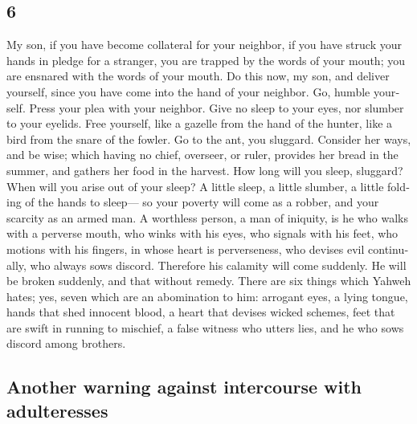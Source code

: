 \begin{paracol}{2}
\begin{otherlanguage}{english}
\hypertarget{section-11}{%
\section{6}\label{section-11}}

 My son, if you have become collateral for your neighbor,
if you have struck your hands in pledge for a stranger, 
you are trapped by the words of your mouth; you are ensnared with the
words of your mouth.  Do this now, my son, and deliver
yourself, since you have come into the hand of your neighbor. Go, humble
yourself. Press your plea with your neighbor.  Give no
sleep to your eyes, nor slumber to your eyelids.  Free
yourself, like a gazelle from the hand of the hunter, like a bird from
the snare of the fowler.  Go to the ant, you sluggard.
Consider her ways, and be wise;  which having no chief,
overseer, or ruler,  provides her bread in the summer, and
gathers her food in the harvest.  How long will you sleep,
sluggard? When will you arise out of your sleep?  A
little sleep, a little slumber, a little folding of the hands to
sleep---  so your poverty will come as a robber, and your
scarcity as an armed man.  A worthless person, a man of
iniquity, is he who walks with a perverse mouth,  who
winks with his eyes, who signals with his feet, who motions with his
fingers,  in whose heart is perverseness, who devises
evil continually, who always sows discord.  Therefore his
calamity will come suddenly. He will be broken suddenly, and that
without remedy.  There are six things which Yahweh hates;
yes, seven which are an abomination to him:  arrogant
eyes, a lying tongue, hands that shed innocent blood,  a
heart that devises wicked schemes, feet that are swift in running to
mischief,  a false witness who utters lies, and he who
sows discord among brothers.

\hypertarget{another-warning-against-intercourse-with-adulteresses}{%
\subsection{Another warning against intercourse with
adulteresses}\label{another-warning-against-intercourse-with-adulteresses}}


\end{otherlanguage}
\end{paracol}
